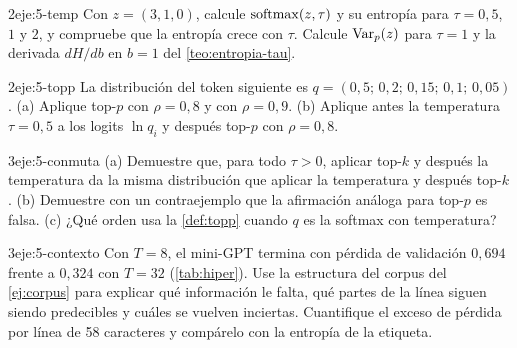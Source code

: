 \begin{ejercicio}{2}{eje:5-temp}
Con $z=(3,1,0)$, calcule $\operatorname{softmax}(z,\tau)$ y su entropía para $\tau=0{,}5$, $1$ y $2$, y compruebe que la entropía crece con $\tau$. Calcule $\operatorname{Var}_{p}(z)$ para $\tau=1$ y la derivada $dH/db$ en $b=1$ del \cref{teo:entropia-tau}.
\end{ejercicio}

\begin{ejercicio}{2}{eje:5-topp}
La distribución del token siguiente es $q=(0{,}5;\allowbreak\,0{,}2;\allowbreak\,0{,}15;\allowbreak\,0{,}1;\allowbreak\,0{,}05)$. (a) Aplique top-$p$ con $\rho=0{,}8$ y con $\rho=0{,}9$. (b) Aplique antes la temperatura $\tau=0{,}5$ a los logits $\ln q_i$ y después top-$p$ con $\rho=0{,}8$.
\end{ejercicio}

\begin{ejercicio}{3}{eje:5-conmuta}
(a) Demuestre que, para todo $\tau>0$, aplicar top-$k$ y después la temperatura da la misma distribución que aplicar la temperatura y después top-$k$. (b) Demuestre con un contraejemplo que la afirmación análoga para top-$p$ es falsa. (c) ¿Qué orden usa la \cref{def:topp} cuando $q$ es la softmax con temperatura?
\end{ejercicio}

\begin{ejercicio}{3}{eje:5-contexto}
Con $T=8$, el mini-GPT termina con pérdida de validación $0{,}694$ frente a $0{,}324$ con $T=32$ (\cref{tab:hiper}). Use la estructura del corpus del \cref{ej:corpus} para explicar qué información le falta, qué partes de la línea siguen siendo predecibles y cuáles se vuelven inciertas. Cuantifique el exceso de pérdida por línea de 58 caracteres y compárelo con la entropía de la etiqueta.
\end{ejercicio}
